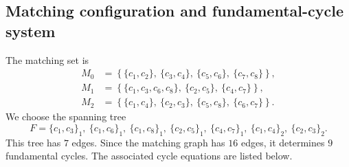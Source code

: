 \documentclass[11pt]{article}
\begin{document}
\subsection{Matching configuration and fundamental-cycle system}
The matching set is
\[
\begin{aligned}
M_0&=\left\{\{c_{1},c_{2}\},\ \{c_{3},c_{4}\},\ \{c_{5},c_{6}\},\ \{c_{7},c_{8}\}\right\},\\
M_1&=\left\{\{c_{1},c_{3},c_{6},c_{8}\},\ \{c_{2},c_{5}\},\ \{c_{4},c_{7}\}\right\},\\
M_2&=\left\{\{c_{1},c_{4}\},\ \{c_{2},c_{3}\},\ \{c_{5},c_{8}\},\ \{c_{6},c_{7}\}\right\}.
\end{aligned}
\]
We choose the spanning tree
\[
F={\{c_{1},c_{3}\}_{1},\ \{c_{1},c_{6}\}_{1},\ \{c_{1},c_{8}\}_{1},\ \{c_{2},c_{5}\}_{1},\ \{c_{4},c_{7}\}_{1},\ \{c_{1},c_{4}\}_{2},\ \{c_{2},c_{3}\}_{2}}.
\]
This tree has $7$ edges.  Since the matching graph has $16$ edges, it determines $9$ fundamental cycles.  The associated cycle equations are listed below.
\end{document}
